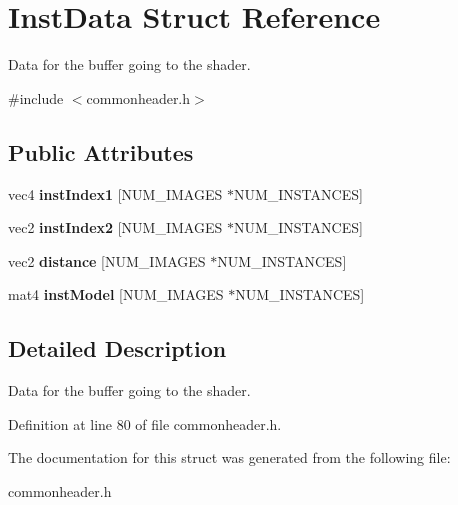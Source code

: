 \hypertarget{structInstData}{}\section{Inst\+Data Struct Reference}
\label{structInstData}


Data for the buffer going to the shader.  




{\ttfamily \#include $<$commonheader.\+h$>$}

\subsection*{Public Attributes}
\begin{DoxyCompactItemize}
\item 
\mbox{\label{structInstData_ae3c2b0364b5744758cf1759228dcf21d}} 
vec4 {\bfseries inst\+Index1} \mbox{[}N\+U\+M\+\_\+\+I\+M\+A\+G\+ES $\ast$N\+U\+M\+\_\+\+I\+N\+S\+T\+A\+N\+C\+ES\mbox{]}
\item 
\mbox{\label{structInstData_aaf5f6b2d5a390f70d422a2a0a18ab809}} 
vec2 {\bfseries inst\+Index2} \mbox{[}N\+U\+M\+\_\+\+I\+M\+A\+G\+ES $\ast$N\+U\+M\+\_\+\+I\+N\+S\+T\+A\+N\+C\+ES\mbox{]}
\item 
\mbox{\label{structInstData_a2c24d884e11884a0156a7f5b3cc674ca}} 
vec2 {\bfseries distance} \mbox{[}N\+U\+M\+\_\+\+I\+M\+A\+G\+ES $\ast$N\+U\+M\+\_\+\+I\+N\+S\+T\+A\+N\+C\+ES\mbox{]}
\item 
\mbox{\label{structInstData_a5ca34ab9e0b0a80af5f28b3a2d4e6c23}} 
mat4 {\bfseries inst\+Model} \mbox{[}N\+U\+M\+\_\+\+I\+M\+A\+G\+ES $\ast$N\+U\+M\+\_\+\+I\+N\+S\+T\+A\+N\+C\+ES\mbox{]}
\end{DoxyCompactItemize}


\subsection{Detailed Description}
Data for the buffer going to the shader. 

Definition at line 80 of file commonheader.\+h.



The documentation for this struct was generated from the following file\+:\begin{DoxyCompactItemize}
\item 
commonheader.\+h\end{DoxyCompactItemize}
